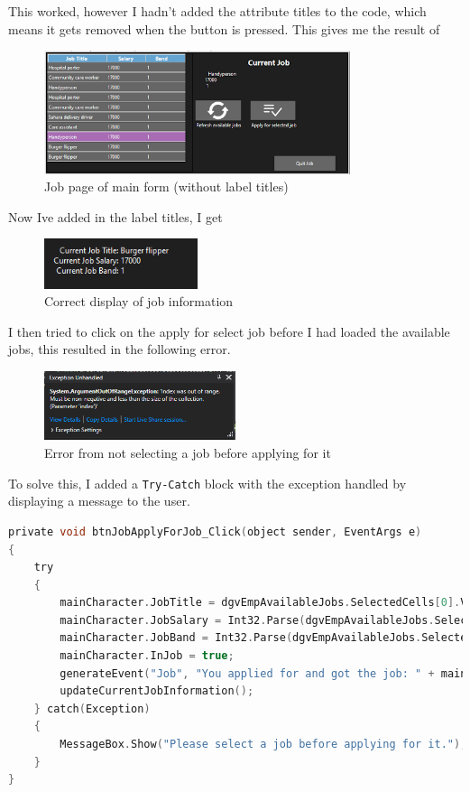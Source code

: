 This worked, however I hadn't added the attribute titles to the code, which means it gets removed when the button is pressed. This gives me the result of
\begin{figure}[H]
    \centering
    \includegraphics[width=0.8\textwidth]{images/implementation/jobs4.png}
    \caption{Job page of main form (without label titles)}
    \label{fig:implementation-jobs4}
\end{figure}
\noindent Now I\textquotesingle ve added in the label titles, I get
\begin{figure}[H]
    \centering
    \includegraphics[width=0.4\textwidth]{images/implementation/jobs5.png}
    \caption{Correct display of job information}
    \label{fig:implementation-jobs5}
\end{figure}
\noindent I then tried to click on the apply for select job before I had loaded the available jobs, this resulted in the following error.
\begin{figure}[H]
    \centering
    \includegraphics[width=0.5\textwidth]{images/implementation/jobs6.png}
    \caption{Error from not selecting a job before applying for it}
    \label{fig:implementation-jobs6}
\end{figure}
\noindent To solve this, I added a \verb|Try-Catch| block with the exception handled by displaying a message to the user.
\begin{lstlisting}[language=c, style=csharp, caption=Apply for job procedure now with try-catch block]
 private void btnJobApplyForJob_Click(object sender, EventArgs e)
{
    try
    {
        mainCharacter.JobTitle = dgvEmpAvailableJobs.SelectedCells[0].Value.ToString();
        mainCharacter.JobSalary = Int32.Parse(dgvEmpAvailableJobs.SelectedCells[1].Value.ToString());
        mainCharacter.JobBand = Int32.Parse(dgvEmpAvailableJobs.SelectedCells[2].Value.ToString());
        mainCharacter.InJob = true;
        generateEvent("Job", "You applied for and got the job: " + mainCharacter.JobTitle, controlClass.InGameDate);
        updateCurrentJobInformation();
    } catch(Exception)
    {
        MessageBox.Show("Please select a job before applying for it.");
    }
}
\end{lstlisting}
